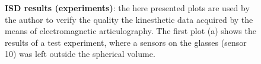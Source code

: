 \begin{figure}
	\centering
	\hspace{0.475\textwidth}
	
	\caption[ISD results (experiments)]{\textbf{ISD results
	(experiments)}: the here presented plots are used by the author to verify 
	the quality the kinesthetic data acquired by the means of electromagnetic 
	articulography.
	The first plot (a) shows the results of a test experiment, where a sensors
	on the glasses (sensor 10) was left outside the spherical volume.
	}
	\label{fig:linguometer:technical:isd:example}
\end{figure}
